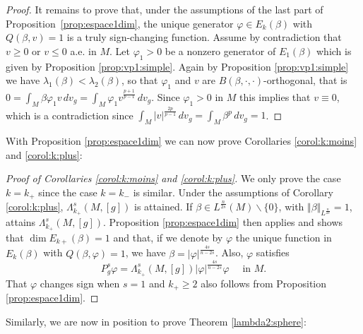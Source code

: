\documentclass[10pt]{amsart}
\numberwithin{equation}{section}
\newcommand{\vp}{\varphi}
\theoremstyle{plain}
\theoremstyle{remark}
\begin{document}
\begin{proof}
\medskip

It remains to prove that, under the assumptions of the last part of Proposition~\ref{prop:espace1dim}, the unique generator $\vp \in E_k(\beta)$ with $Q(\beta, v) = 1$ is a truly sign-changing function. Assume by contradiction that $v \ge 0$ or $v \le 0$ a.e. in $M$. Let $\vp_1 >0$ be a nonzero generator of $E_1(\beta)$ which is given by Proposition \ref{prop:vp1:simple}. Again by Proposition \ref{prop:vp1:simple} we have $\lambda_1(\beta) < \lambda_2(\beta)$, so that $\vp_1$ and $v$ are $B(\beta, \cdot, \cdot)$-orthogonal, that is $0 = \int_{M} \beta \vp_1 v \, dv_g = \int_M \vp_1 v^{\frac{p+1}{p-1}} \, dv_g$. Since $\vp_1 >0$ in $M$ this implies that $v \equiv 0$, which is a contradiction since $\int_M |v|^{\frac{2p}{p-1}} \, dv_g = \int_M \beta^{p}\, dv_g =  1$.
\end{proof}


With Proposition \ref{prop:espace1dim} we can now prove Corollaries \ref{corol:k:moins} and \ref{corol:k:plus}:

\begin{proof}[Proof of Corollaries \ref{corol:k:moins} and \ref{corol:k:plus}]
We only prove the case $k = k_+$ since the case $k = k_-$ is similar. Under the assumptions of Corollary \ref{corol:k:plus}, $\Lambda_{k_+}^s(M,[g])$ is attained. If $ \beta \in L^{\frac{n}{2s}}(M) \backslash \{0\}$, with $\Vert \beta \Vert_{L^{\frac{n}{2s}}} = 1$, attains  $\Lambda_{k_+}^s(M,[g])$. Proposition \ref{prop:espace1dim} then applies and shows that $\dim E_{k+}(\beta) = 1$ and that, if we denote by $\vp$ the unique function in $E_k(\beta)$ with $Q(\beta, \vp) = 1$, we have $\beta = |\vp|^{\frac{4s}{n-2s}}$. Also, $\vp$ satisfies 
$$ P_g^s \vp =  \Lambda_{k_+}^s(M,[g])|\vp|^{\frac{4s}{n-2s}} \vp \quad \text{ in } M.$$
That $\vp$ changes sign when $s=1$ and $k_+ \ge 2$ also follows from  Proposition \ref{prop:espace1dim}.
\end{proof} 

Similarly, we are now in position to prove Theorem \ref{lambda2:sphere}:
\end{document}
